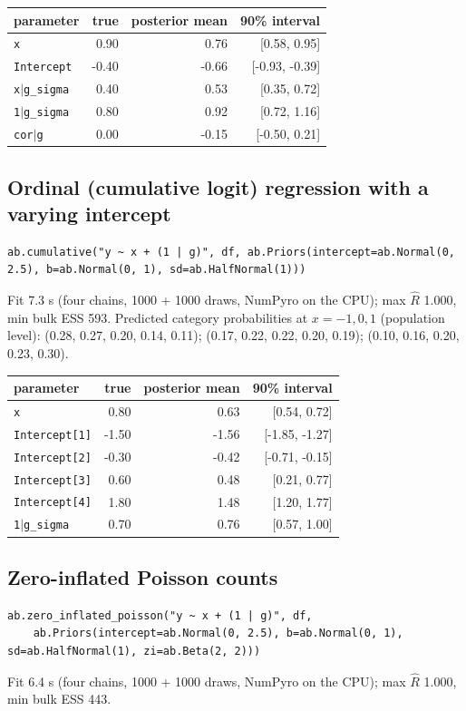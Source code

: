 \documentclass[11pt]{article}
\newcommand{\code}[1]{\texttt{#1}}
\begin{document}
\begin{center}\begin{tabular}{@{}lrrr@{}}\toprule parameter & true & posterior mean & 90\% interval \\ \midrule
\code{x} & 0.90 & 0.76 & [0.58, 0.95] \\
\code{Intercept} & -0.40 & -0.66 & [-0.93, -0.39] \\
\code{x$|$g\_sigma} & 0.40 & 0.53 & [0.35, 0.72] \\
\code{1$|$g\_sigma} & 0.80 & 0.92 & [0.72, 1.16] \\
\code{cor$|$g} & 0.00 & -0.15 & [-0.50, 0.21] \\
\bottomrule\end{tabular}\end{center}\normalsize

\subsection*{Ordinal (cumulative logit) regression with a varying intercept}
\begin{lstlisting}
ab.cumulative("y ~ x + (1 | g)", df, ab.Priors(intercept=ab.Normal(0, 2.5), b=ab.Normal(0, 1), sd=ab.HalfNormal(1)))
\end{lstlisting}
\noindent\small Fit 7.3 s (four chains, 1000 + 1000 draws, NumPyro on the CPU); max $\hat R$ 1.000, min bulk ESS 593. Predicted category probabilities at $x = -1, 0, 1$ (population level): (0.28, 0.27, 0.20, 0.14, 0.11); (0.17, 0.22, 0.22, 0.20, 0.19); (0.10, 0.16, 0.20, 0.23, 0.30).

\begin{center}\begin{tabular}{@{}lrrr@{}}\toprule parameter & true & posterior mean & 90\% interval \\ \midrule
\code{x} & 0.80 & 0.63 & [0.54, 0.72] \\
\code{Intercept[1]} & -1.50 & -1.56 & [-1.85, -1.27] \\
\code{Intercept[2]} & -0.30 & -0.42 & [-0.71, -0.15] \\
\code{Intercept[3]} & 0.60 & 0.48 & [0.21, 0.77] \\
\code{Intercept[4]} & 1.80 & 1.48 & [1.20, 1.77] \\
\code{1$|$g\_sigma} & 0.70 & 0.76 & [0.57, 1.00] \\
\bottomrule\end{tabular}\end{center}\normalsize

\subsection*{Zero-inflated Poisson counts}
\begin{lstlisting}
ab.zero_inflated_poisson("y ~ x + (1 | g)", df,
    ab.Priors(intercept=ab.Normal(0, 2.5), b=ab.Normal(0, 1), sd=ab.HalfNormal(1), zi=ab.Beta(2, 2)))
\end{lstlisting}
\noindent\small Fit 6.4 s (four chains, 1000 + 1000 draws, NumPyro on the CPU); max $\hat R$ 1.000, min bulk ESS 443.
\end{document}

